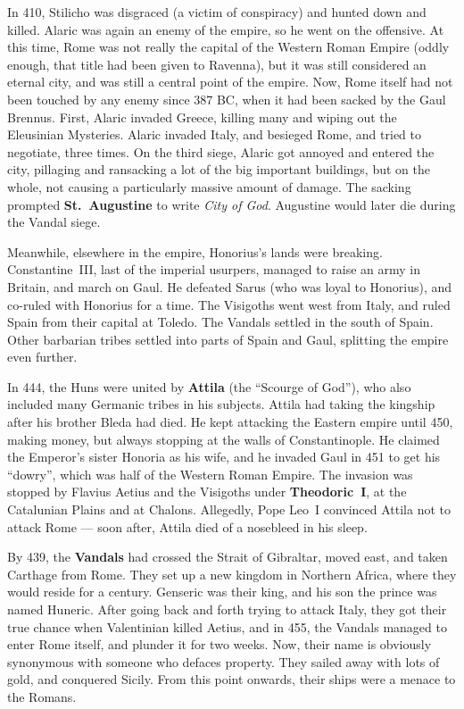 In 410, Stilicho was disgraced (a victim of conspiracy) and hunted down and killed.
Alaric was again an enemy of the empire, so he went on the offensive.
At this time, Rome was not really the capital of the Western Roman Empire
(oddly enough, that title had been given to Ravenna),
but it was still considered an eternal city, and was still a central point of the empire.
Now, Rome itself had not been touched by any enemy since 387 BC,
when it had been sacked by the Gaul Brennus.
First, Alaric invaded Greece, killing many and wiping out the Eleusinian Mysteries.
Alaric invaded Italy, and besieged Rome, and tried to negotiate, three times.
On the third siege, Alaric got annoyed and entered the city,
pillaging and ransacking a lot of the big important buildings,
but on the whole, not causing a particularly massive amount of damage.
The sacking prompted \textbf{St.\ Augustine} to write \textit{City of God}.
Augustine would later die during the Vandal siege.

Meanwhile, elsewhere in the empire, Honorius's lands were breaking.
Constantine~III, last of the imperial usurpers, managed to raise an army in Britain, and march on Gaul.
He defeated Sarus (who was loyal to Honorius), and co-ruled with Honorius for a time.
The Visigoths went west from Italy, and ruled Spain from their capital at Toledo.
The Vandals settled in the south of Spain.
Other barbarian tribes settled into parts of Spain and Gaul, splitting the empire even further.

In 444, the Huns were united by \textbf{Attila} (the ``Scourge of God''),
who also included many Germanic tribes in his subjects.
Attila had taking the kingship after his brother Bleda had died.
He kept attacking the Eastern empire until 450, making money,
but always stopping at the walls of Constantinople.
He claimed the Emperor's sister Honoria as his wife,
and he invaded Gaul in 451 to get his ``dowry'', which was half of the Western Roman Empire.
The invasion was stopped by Flavius Aetius and the Visigoths under \textbf{Theodoric~I},
at the Catalunian Plains and at Chalons.
Allegedly, Pope Leo~I convinced Attila not to attack Rome ---
soon after, Attila died of a nosebleed in his sleep.

By 439, the \textbf{Vandals} had crossed the Strait of Gibraltar, moved east, and taken Carthage from Rome.
They set up a new kingdom in Northern Africa, where they would reside for a century.
Genseric was their king, and his son the prince was named Huneric.
After going back and forth trying to attack Italy, they got their true chance when Valentinian killed Aetius,
and in 455, the Vandals managed to enter Rome itself, and plunder it for two weeks.
Now, their name is obviously synonymous with someone who defaces property.
They sailed away with lots of gold, and conquered Sicily.
From this point onwards, their ships were a menace to the Romans.

